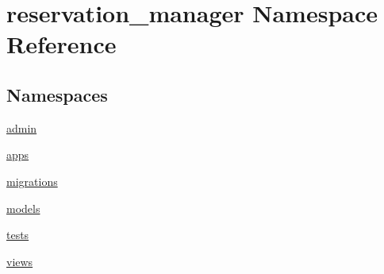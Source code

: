 \hypertarget{namespacereservation__manager}{\section{reservation\-\_\-manager Namespace Reference}
\label{namespacereservation__manager}
}
\subsection*{Namespaces}
\begin{DoxyCompactItemize}
\item 
\hyperlink{namespacereservation__manager_1_1admin}{admin}
\item 
\hyperlink{namespacereservation__manager_1_1apps}{apps}
\item 
\hyperlink{namespacereservation__manager_1_1migrations}{migrations}
\item 
\hyperlink{namespacereservation__manager_1_1models}{models}
\item 
\hyperlink{namespacereservation__manager_1_1tests}{tests}
\item 
\hyperlink{namespacereservation__manager_1_1views}{views}
\end{DoxyCompactItemize}
